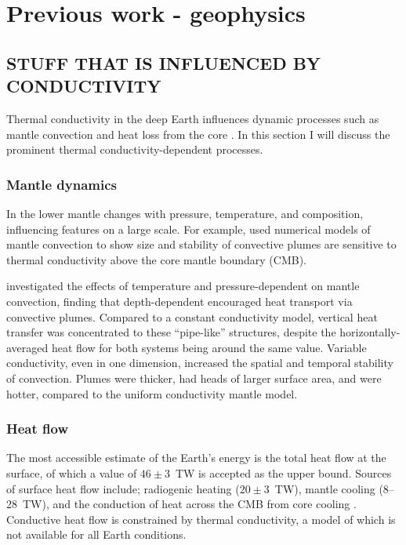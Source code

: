 \section{Previous work - geophysics}

\subsection{STUFF THAT IS INFLUENCED BY CONDUCTIVITY}
\label{sec:ch1:cond_in_earth}

Thermal conductivity in the deep Earth influences dynamic processes such as mantle convection and heat loss from the core \citep{Lay2008}. In this section I will discuss the prominent thermal conductivity-dependent processes.

\subsubsection{Mantle dynamics}

In the lower mantle \tcs changes with pressure, temperature, and composition, influencing features on a large scale. For example, \citet{Naliboff2006} used numerical models of mantle convection to show size and stability of convective plumes are sensitive to thermal conductivity above the core mantle boundary (CMB).

\citet{Dubuffet2000} investigated the effects of temperature and pressure-dependent \tcs on mantle convection, finding that depth-dependent \tcs encouraged heat transport via convective plumes. Compared to a constant conductivity model, vertical heat transfer was concentrated to these ``pipe-like'' structures, despite the horizontally-averaged heat flow for both systems being around the same value. Variable conductivity, even in one dimension, increased the spatial and temporal stability of convection. Plumes were thicker, had heads of larger surface area, and were hotter, compared to the uniform conductivity mantle model.

\subsubsection{Heat flow}

The most accessible estimate of the Earth's energy is the total heat flow at the surface, of which a value of $46\pm3$~TW is accepted as the upper bound. Sources of surface heat flow include; radiogenic heating ($20\pm3$~TW), mantle cooling (8--28~TW), and the conduction of heat across the CMB from core cooling \citep{Lay2008}. Conductive heat flow is constrained by thermal conductivity, a model of which is not available for all Earth conditions.

